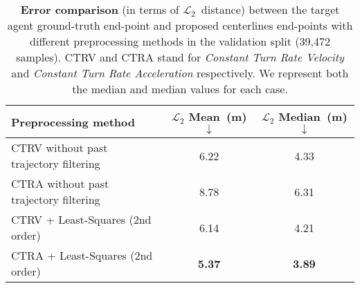  \begin{table}[!ht]
	\centering
	\caption{\textbf{Error comparison} (in terms of $\mathcal{L}_2$~distance) between the target agent ground-truth end-point and proposed centerlines end-points with different preprocessing methods in the validation split (39,472 samples). CTRV and CTRA stand for \textit{Constant Turn Rate Velocity} and \textit{Constant Turn Rate Acceleration} respectively. We represent both the median and median values for each case.
	}
		\begin{tabular}{l c c}
			\toprule
			Preprocessing method & $\mathcal{L}_2$ Mean~(m) $\downarrow$ & $\mathcal{L}_2$ Median~(m) $\downarrow$ \\
			\midrule
			CTRV without past trajectory filtering & 6.22 & 4.33 \\
			CTRA without past trajectory filtering & 8.78 & 6.31 \\
			CTRV + Least-Squares (2nd order) & 6.14 & 4.21 \\
			CTRA + Least-Squares (2nd order) & \textbf{5.37} & \textbf{3.89} \\
			\bottomrule
	\end{tabular}%
	\label{table:error_goals_2}
\end{table}

